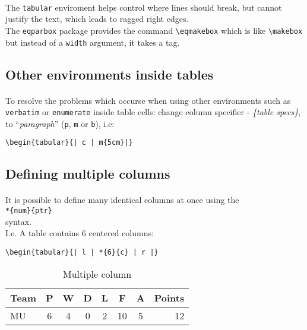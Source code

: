 \documentclass[11pt,a4paper]{article}
\begin{document}
\paragraph{}
The \verb|tabular| enviroment helps control where lines should break, but
cannot justify the text, which leads to ragged right edges.\\
The \texttt{eqparbox} package provides the command \verb|\eqmakebox| which is
like \verb|\makebox| but instead of a \texttt{width} argument, it takes a tag.

\subsection{Other environments inside tables}
\paragraph{}
To resolve the problems which occurse when using other environments such as
\texttt{verbatim} or \texttt{enumerate} inside table cells: change column specifier
- \emph{\{table specs\}}, to ``\emph{paragraph}'' (\texttt{p}, \texttt{m} or \texttt{b}),
i.e:
\begin{verbatim}
\begin{tabular}{| c | m{5cm}|}
\end{verbatim}

\subsection[Multiple columns]{Defining multiple columns}
\paragraph{}
It is possible to define many identical columns at once using the \\
\verb|*{num}{ptr}|\\ syntax.\\
I.e. A table contains 6 centered columns:
\begin{verbatim}
\begin{tabular}{| l | *{6}{c} | r |}
\end{verbatim}
\begin{table}[htbp]
	\centering
	\begin{tabular}{| l | *{6}{c} | r |}
	Team & P & W & D & L & F & A & Points \\ \hline
	MU & 6 & 4 & 0 & 2 & 10 & 5 & 12 \\
	\end{tabular}
\caption{Multiple column}
\label{multicols}
\end{table}
\end{document}
